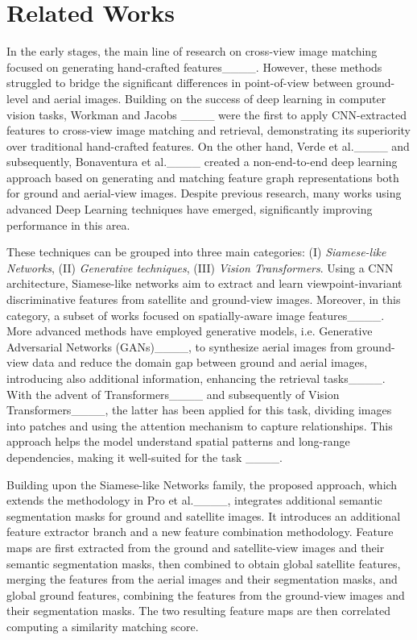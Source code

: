 \section{Related Works}
In the early stages, the main line of research on cross-view image matching focused on generating hand-crafted features____. However, these methods struggled to bridge the significant differences in point-of-view between ground-level and aerial images. 
Building on the success of deep learning in computer vision tasks, Workman and Jacobs ____ were the first to apply CNN-extracted features to cross-view image matching and retrieval, demonstrating its superiority over traditional hand-crafted features. On the other hand, Verde et al.____ and subsequently, Bonaventura et al.____ created a non-end-to-end deep learning approach based on generating and matching feature graph representations both for ground and aerial-view images. Despite previous research, many works using advanced Deep Learning techniques have emerged, significantly improving performance in this area.

These techniques can be grouped into three main categories: (I) \textit{Siamese-like Networks}, (II) \textit{Generative techniques}, (III) \textit{Vision Transformers}. Using a CNN architecture, Siamese-like networks aim to extract and learn viewpoint-invariant discriminative features from satellite and ground-view images. Moreover, in this category, a subset of works focused on spatially-aware image features____. More advanced methods have employed generative models, i.e. Generative Adversarial Networks (GANs)____, to synthesize aerial images from ground-view data and reduce the domain gap between ground and aerial images, introducing also additional information, enhancing the retrieval tasks____. With the advent of Transformers____ and subsequently of Vision Transformers____, the latter has been applied for this task, dividing images into patches and using the attention mechanism to capture relationships. This approach helps the model understand spatial patterns and long-range dependencies, making it well-suited for the task ____.

%
%
Building upon the Siamese-like Networks family, the proposed approach, which extends the methodology in Pro et al.____, integrates additional semantic segmentation masks for ground and satellite images. It introduces an additional feature extractor branch and a new feature combination methodology. Feature maps are first extracted from the ground and satellite-view images and their semantic segmentation masks, then combined to obtain global satellite
features, merging the features from the aerial images and their segmentation masks, and global ground features, combining the features from the ground-view images and their segmentation masks. The two resulting feature maps are then correlated computing a similarity matching score.

